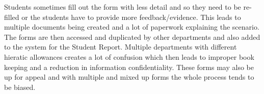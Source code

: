 \documentclass[../main.tex]{subfiles}
\begin{document}
\raggedright
Students sometimes fill out the form with less detail and so they need to be re-filled or the students have to provide more feedback/evidence. This leads to multiple documents being created and a lot of paperwork explaining the scenario. The forms are then accessed and duplicated by other departments and also added to the system for the Student Report. Multiple departments with different hieratic allowances creates a lot of confusion which then leads to improper book keeping and a reduction in information confidentiality. These forms may also be up for appeal and with multiple and mixed up forms the whole process tends to be biased. 
\end{document}
